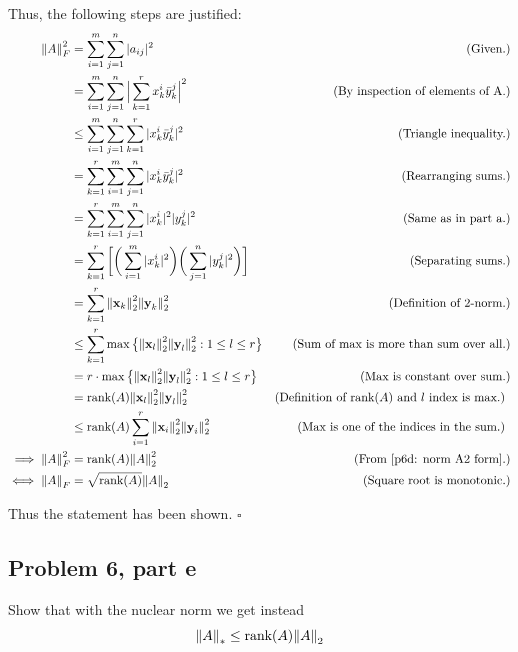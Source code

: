 \begin{solution}
    Thus, the following steps are justified:
    \alignbreak
    \begin{align}
        \norm{A}_F^2 &= \sum_{i = 1}^m\sum_{j = 1}^n |a_{ij}|^2 &\text{(Given.)}\nonumber\\
        &= \sum_{i = 1}^m\sum_{j = 1}^n \Big| \sum_{k = 1}^r x_k^i\Bar{y}_k^j\Big|^2 &\text{(By inspection of elements of A.)}\nonumber\\
        &\leq \sum_{i = 1}^m\sum_{j = 1}^n\sum_{k = 1}^r|x^i_k\Bar{y}_k^j|^2 &\text{(Triangle inequality.)}\nonumber\\
        &= \sum_{k = 1}^r\sum_{i = 1}^m\sum_{j = 1}^n|x^i_k\Bar{y}_k^j|^2 &\text{(Rearranging sums.)}\nonumber\\
        &= \sum_{k = 1}^r\sum_{i = 1}^m\sum_{j = 1}^n |x_k^i|^2|y_k^j|^2 &\text{(Same as in part a.)}\nonumber\\
        &= \sum_{k = 1}^r \bigg[ \bigg( \sum_{i = 1}^m |x_k^i|^2\bigg)\bigg( \sum_{j = 1}^n|y_k^j|^2 \bigg)\bigg] &\text{(Separating sums.)}\nonumber\\
        &= \sum_{k = 1}^r\norm{\textbf{x}_k}_2^2\norm{\textbf{y}_k}_2^2 &\text{(Definition of $2$-norm.)}\nonumber\\
        &\leq \sum_{k = 1}^r \max\big\{\norm{\textbf{x}_l}_2^2\norm{\textbf{y}_l}_2^2 : 1 \leq l \leq r\big\} &\text{(Sum of max is more than sum over all.)}\nonumber\\
        &= r \cdot \max\big\{\norm{\textbf{x}_l}_2^2\norm{\textbf{y}_l}_2^2 : 1 \leq l \leq r\big\} &\text{(Max is constant over sum.)}\nonumber\\
        &= \text{rank}(A)\norm{\textbf{x}_l}_2^2\norm{\textbf{y}_l}_2^2 &\text{(Definition of rank$(A)$ and $l$ index is max.) }\nonumber\\
        &\leq \text{rank}(A)\sum_{i = 1}^r\norm{\textbf{x}_i}_2^2\norm{\textbf{y}_i}_2^2 &\text{(Max is one of the indices in the sum.) }\nonumber\\
        \implies \norm{A}_F^2 &= \text{rank}(A) \norm{A}_2^2&\text{(From \ref{p6d: norm A2 form}.)}\nonumber\\
        \iff \norm{A}_F &= \sqrt{\text{rank}(A)} \norm{A}_2 &\text{(Square root is monotonic.)}\nonumber
    \end{align}
    \alignbreak

    Thus the statement has been shown. $\square$
\end{solution}

\newpage
\subsection{Problem 6, part e}
Show that with the nuclear norm we get instead
\[
\norm{A}_* \leq \text{rank}(A)\norm{A}_2
\]

